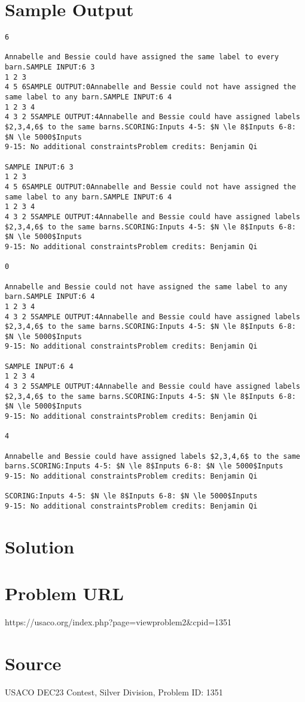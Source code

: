\documentclass[12pt]{article}
\begin{document}
\section*{Sample Output}
\begin{verbatim}
6

Annabelle and Bessie could have assigned the same label to every barn.SAMPLE INPUT:6 3
1 2 3
4 5 6SAMPLE OUTPUT:0Annabelle and Bessie could not have assigned the same label to any barn.SAMPLE INPUT:6 4
1 2 3 4
4 3 2 5SAMPLE OUTPUT:4Annabelle and Bessie could have assigned labels $2,3,4,6$ to the same barns.SCORING:Inputs 4-5: $N \le 8$Inputs 6-8: $N \le 5000$Inputs
9-15: No additional constraintsProblem credits: Benjamin Qi

SAMPLE INPUT:6 3
1 2 3
4 5 6SAMPLE OUTPUT:0Annabelle and Bessie could not have assigned the same label to any barn.SAMPLE INPUT:6 4
1 2 3 4
4 3 2 5SAMPLE OUTPUT:4Annabelle and Bessie could have assigned labels $2,3,4,6$ to the same barns.SCORING:Inputs 4-5: $N \le 8$Inputs 6-8: $N \le 5000$Inputs
9-15: No additional constraintsProblem credits: Benjamin Qi

0

Annabelle and Bessie could not have assigned the same label to any barn.SAMPLE INPUT:6 4
1 2 3 4
4 3 2 5SAMPLE OUTPUT:4Annabelle and Bessie could have assigned labels $2,3,4,6$ to the same barns.SCORING:Inputs 4-5: $N \le 8$Inputs 6-8: $N \le 5000$Inputs
9-15: No additional constraintsProblem credits: Benjamin Qi

SAMPLE INPUT:6 4
1 2 3 4
4 3 2 5SAMPLE OUTPUT:4Annabelle and Bessie could have assigned labels $2,3,4,6$ to the same barns.SCORING:Inputs 4-5: $N \le 8$Inputs 6-8: $N \le 5000$Inputs
9-15: No additional constraintsProblem credits: Benjamin Qi

4

Annabelle and Bessie could have assigned labels $2,3,4,6$ to the same barns.SCORING:Inputs 4-5: $N \le 8$Inputs 6-8: $N \le 5000$Inputs
9-15: No additional constraintsProblem credits: Benjamin Qi

SCORING:Inputs 4-5: $N \le 8$Inputs 6-8: $N \le 5000$Inputs
9-15: No additional constraintsProblem credits: Benjamin Qi
\end{verbatim}

\section*{Solution}


\section*{Problem URL}
https://usaco.org/index.php?page=viewproblem2&cpid=1351

\section*{Source}
USACO DEC23 Contest, Silver Division, Problem ID: 1351
\end{document}

